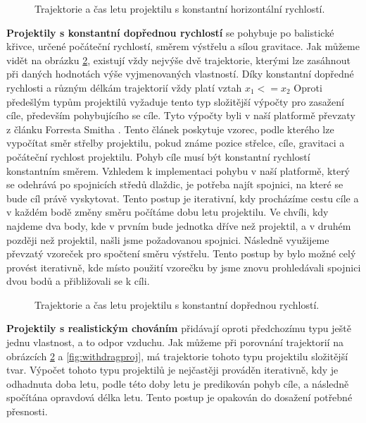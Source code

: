\begin{figure}[h]
	\centering
	\def\svgwidth{0.7\textwidth}
	
	\caption{Trajektorie a čas letu projektilu s konstantní horizontální rychlostí.}
	\label{fig:horizontalproj}
\end{figure}

\textbf{Projektily s konstantní dopřednou rychlostí} se pohybuje po balistické křivce, určené počáteční rychlostí, směrem výstřelu a sílou gravitace. Jak můžeme vidět na obrázku \ref{fig:forwardproj}, existují vždy nejvýše dvě trajektorie, kterými lze zasáhnout při daných hodnotách výše vyjmenovaných vlastností. Díky konstantní dopředné rychlosti a různým délkám trajektorií vždy platí vztah \(x_1 <= x_2\) Oproti předešlým typům projektilů vyžaduje tento typ složitější výpočty pro zasažení cíle, především pohybujícího se cíle. Tyto výpočty byli v naší platformě převzaty z článku Forresta Smitha \citep{site:projectilecalc}. Tento článek poskytuje vzorec, podle kterého lze vypočítat směr střelby projektilu, pokud známe pozice střelce, cíle, gravitaci a počáteční rychlost projektilu. Pohyb cíle musí být konstantní rychlostí konstantním směrem. Vzhledem k implementaci pohybu v naší platformě, který se odehrává po spojnicích středů dlaždic, je potřeba najít spojnici, na které se bude cíl právě vyskytovat. Tento postup je iterativní, kdy procházíme cestu cíle a v každém bodě změny směru počítáme dobu letu projektilu. Ve chvíli, kdy najdeme dva body, kde v prvním bude jednotka dříve než projektil, a v druhém později než projektil, našli jsme požadovanou spojnici. Následně využijeme převzatý vzoreček pro spočtení směru výstřelu. Tento postup by bylo možné celý provést iterativně, kde místo použití vzorečku by jsme znovu prohledávali spojnici dvou bodů a přibližovali se k cíli.

\begin{figure}[h]
	\centering
	\def\svgwidth{0.7\textwidth}
	
	\caption{Trajektorie a čas letu projektilu s konstantní dopřednou rychlostí.}
	\label{fig:forwardproj}
\end{figure}

\textbf{Projektily s realistickým chováním} přidávají oproti předchozímu typu ještě jednu vlastnost, a to odpor vzduchu. Jak můžeme při porovnání trajektorií na obrázcích \ref{fig:forwardproj} a \ref{fig:withdragproj}, má trajektorie tohoto typu projektilu složitější tvar.  Výpočet tohoto typu projektilů je nejčastěji prováděn iterativně, kdy je odhadnuta doba letu, podle této doby letu je predikován pohyb cíle, a následně spočítána opravdová délka letu. Tento postup je opakován do dosažení potřebné přesnosti.

